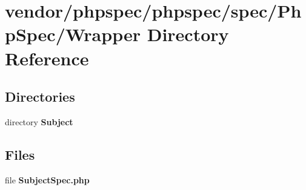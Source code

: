 \section{vendor/phpspec/phpspec/spec/\+Php\+Spec/\+Wrapper Directory Reference}
\label{dir_ce51e8b8b9bf56f81820366683ecffd3}
\subsection*{Directories}
\begin{DoxyCompactItemize}
\item 
directory {\bf Subject}
\end{DoxyCompactItemize}
\subsection*{Files}
\begin{DoxyCompactItemize}
\item 
file {\bf Subject\+Spec.\+php}
\end{DoxyCompactItemize}

